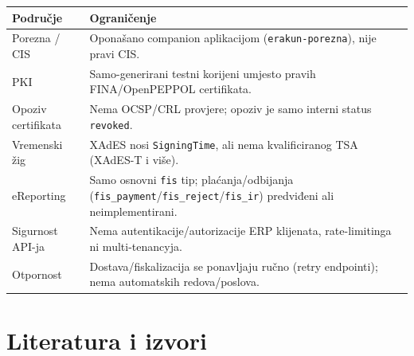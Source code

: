 \documentclass[11pt,a4paper]{article}
\begin{document}
\begin{tabularx}{\textwidth}{@{}lY@{}}
\toprule
\textbf{Područje} & \textbf{Ograničenje} \\
\midrule
Porezna / CIS & Oponašano companion aplikacijom (\texttt{erakun-porezna}), nije pravi CIS. \\
PKI & Samo-generirani testni korijeni umjesto pravih FINA/OpenPEPPOL certifikata. \\
Opoziv certifikata & Nema OCSP/CRL provjere; opoziv je samo interni status \texttt{revoked}. \\
Vremenski žig & XAdES nosi \texttt{SigningTime}, ali nema kvalificiranog TSA (XAdES-T i više). \\
eReporting & Samo osnovni \texttt{fis} tip; plaćanja/odbijanja (\texttt{fis\_payment}/\texttt{fis\_reject}/\texttt{fis\_ir}) predviđeni ali neimplementirani. \\
Sigurnost API-ja & Nema autentikacije/autorizacije ERP klijenata, rate-limitinga ni multi-tenancyja. \\
Otpornost & Dostava/fiskalizacija se ponavljaju ručno (retry endpointi); nema automatskih redova/poslova. \\
\bottomrule
\end{tabularx}

\section{Literatura i izvori}
\end{document}
